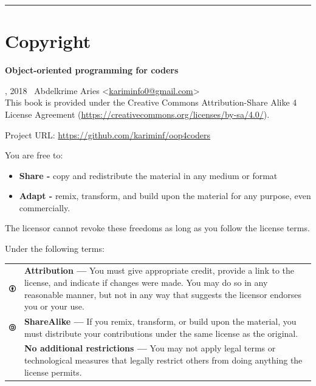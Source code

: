 \documentclass[12pt]{book}
\begin{document}
\fi

\newpage
\hrule
\chapter*{Copyright}

\begin{center}
	{\Huge \textbf{Object-oriented programming for coders}}
\end{center}


, 2018  \textcopyright\ Abdelkrime Aries <\href{mailto://kariminfo0@gmail.com}{kariminfo0@gmail.com}> \\[0.5cm]
This book is provided under the Creative Commons Attribution-Share Alike 4 License Agreement (\url{https://creativecommons.org/licenses/by-sa/4.0/}).

\vspace{0.5cm}
\noindent
Project URL: \url{https://github.com/kariminf/oop4coders}

\vspace{1cm}

\scriptsize %
\vspace{1cm}
\noindent
You are free to:
\begin{itemize}
\item \textbf{Share -} copy and redistribute the material in any medium or format
\item \textbf{Adapt -} remix, transform, and build upon the material for any purpose, even commercially.
\end{itemize}
The licensor cannot revoke these freedoms as long as you follow the license terms.

\vspace{1cm}
\noindent
Under the following terms:\\
\begin{tabular}{m{}m{}}
%
\includegraphics[width=1cm]{img/by.png} & 
\textbf{Attribution —} You must give appropriate credit, provide a link to the license, and indicate if changes were made. You may do so in any reasonable manner, but not in any way that suggests the licensor endorses you or your use. \\
%
\includegraphics[width=1cm]{img/sa.png} &
\textbf{ShareAlike —} If you remix, transform, or build upon the material, you must distribute your contributions under the same license as the original.\\
%
&
\textbf{No additional restrictions —} You may not apply legal terms or technological measures that legally restrict others from doing anything the license permits.
%
\end{tabular}
\end{document}
